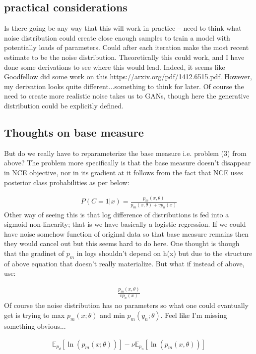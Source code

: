\documentclass[twoside,11pt]{article}
\begin{document}
\subsection{practical considerations}
Is there going be any way that this will work in practice -- need to think what noise distribution could create close enough samples to train a model with potentially loads of parameters. Could after each iteration make the most recent estimate to be the noise distribution. Theoretically this could work, and I have done some derivations to see where this would lead. Indeed, it seems like Goodfellow did some work on this https://arxiv.org/pdf/1412.6515.pdf. However, my derivation looks quite different...something to think for later. Of course the need to create more realistic noise takes us to GANs, though here the generative distribution could be explicitly defined.




\subsection{Thoughts on base measure}
But do we really have to reparameterize the base measure i.e. problem (3) from above? The problem more specifically is that the base measure doesn't disappear in NCE objective, nor in its gradient at it follows from the fact that NCE uses posterior class probabilities as per below:

\begin{align}
	P(C=1|x)=\frac{p_m(x, \theta)}{p_m(x, \theta) + vp_n(x)}
\end{align}
Other way of seeing this is that log difference of distributions is fed into a sigmoid non-linearity; that is we have basically a logistic regression. If we could have noise somehow function of original data so that base measure remains then they would cancel out but this seems hard to do here. One thought is though that the gradinet of $p_m$ in logs shouldn't depend on h(x) but due to the structure of above equation that doesn't really materialize. But what if instead of above, use:

\begin{align}
	\frac{p_m(x, \theta)}{vp_n(x)}
\end{align}
Of course the noise distribution has no parameters so what one could evantually get is trying to max $p_m(x;\theta)$ and min $p_m(y_n;\theta)$. Feel like I'm missing something obvious...

\begin{align}
	\mathbb{E}_{p_d} \left[\ln(p_m(x; \theta)) \right] - \nu \mathbb{E}_{p_n} \left[\ln(p_m(x,\theta)) \right]
\end{align}
\end{document}
